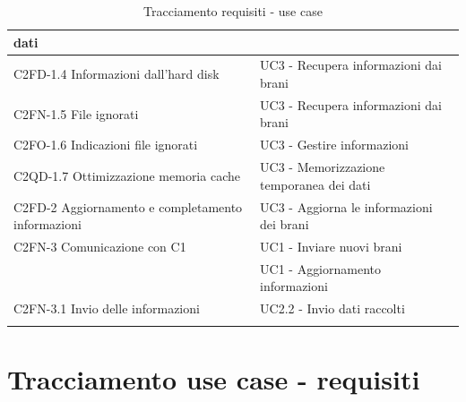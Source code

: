 \begin{footnotesize}
\begin{longtable}[!h]{|l|l|}
dati \\ \hline
C2FD-1.4 Informazioni dall'hard disk & UC3 - Recupera informazioni dai brani \\
\hline
C2FN-1.5 File ignorati & UC3 - Recupera informazioni dai brani\\ \hline
C2FO-1.6 Indicazioni file ignorati & UC3 - Gestire informazioni \\ \hline
C2QD-1.7 Ottimizzazione memoria cache & UC3 - Memorizzazione temporanea dei dati
\\ \hline
C2FD-2 Aggiornamento e completamento informazioni & UC3 - Aggiorna le
informazioni dei brani \\ \hline
C2FN-3 Comunicazione con C1 & UC1 - Inviare nuovi brani \\
 & UC1 - Aggiornamento informazioni \\ \hline
C2FN-3.1 Invio delle informazioni & UC2.2 - Invio dati raccolti \\ \hline
\caption{Tracciamento requisiti - use case}
\end{longtable}
\end{footnotesize}

\newpage
\section{Tracciamento use case - requisiti}

